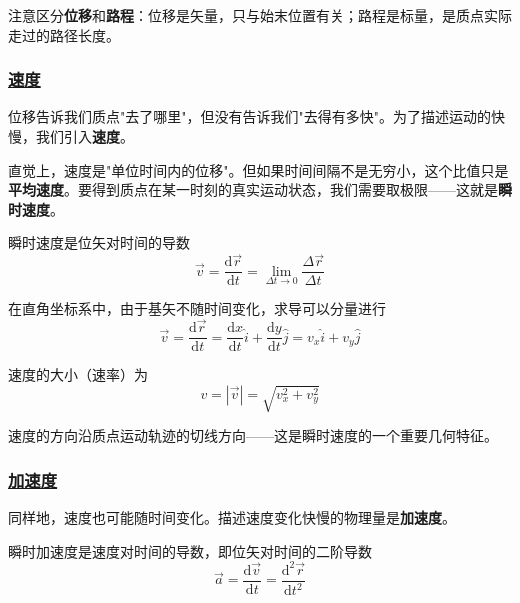 注意区分\textbf{位移}和\textbf{路程}：位移是矢量，只与始末位置有关；路程是标量，是质点实际走过的路径长度。

\subsubsection{\protect\hyperlink{:}{速度}}

位移告诉我们质点"去了哪里"，但没有告诉我们"去得有多快"。为了描述运动的快慢，我们引入\textbf{速度}。

直觉上，速度是"单位时间内的位移"。但如果时间间隔不是无穷小，这个比值只是\textbf{平均速度}。要得到质点在某一时刻的真实运动状态，我们需要取极限——这就是\textbf{瞬时速度}。

\begin{definition}[瞬时速度]
    瞬时速度是位矢对时间的导数
    \begin{equation}
        \vec{v} = \frac{\mathrm{d}\vec{r}}{\mathrm{d}t} = \lim_{\Delta t \to 0} \frac{\Delta\vec{r}}{\Delta t}
    \end{equation}
\end{definition}

在直角坐标系中，由于基矢不随时间变化，求导可以分量进行
\begin{equation}
    \vec{v} = \frac{\mathrm{d}\vec{r}}{\mathrm{d}t} = \frac{\mathrm{d}x}{\mathrm{d}t}\hat{i} + \frac{\mathrm{d}y}{\mathrm{d}t}\hat{j} = v_x\hat{i} + v_y\hat{j}
\end{equation}

速度的大小（速率）为
\begin{equation}
    v = |\vec{v}| = \sqrt{v_x^2 + v_y^2}
\end{equation}

速度的方向沿质点运动轨迹的切线方向——这是瞬时速度的一个重要几何特征。

\subsubsection{\protect\hyperlink{:}{加速度}}

同样地，速度也可能随时间变化。描述速度变化快慢的物理量是\textbf{加速度}。

\begin{definition}[瞬时加速度]
    瞬时加速度是速度对时间的导数，即位矢对时间的二阶导数
    \begin{equation}
        \vec{a} = \frac{\mathrm{d}\vec{v}}{\mathrm{d}t} = \frac{\mathrm{d}^2\vec{r}}{\mathrm{d}t^2}
    \end{equation}
\end{definition}

